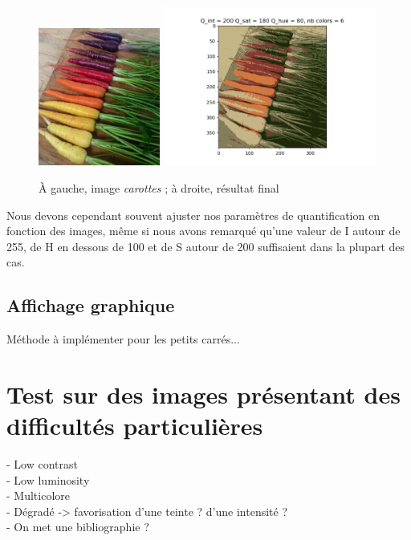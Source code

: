 \documentclass{article}
\begin{document}
\begin{figure}[h]
    \centering
    \includegraphics[width=4cm]{carottes.jpg}
    \includegraphics[width=7cm]{fig9.png}
    \caption{À gauche, image {\it carottes} ; à droite, résultat final}
\end{figure}

Nous devons cependant souvent ajuster nos paramètres de quantification en fonction des images, même si nous avons remarqué qu'une valeur de I autour de 255, de H en dessous de 100 et de S autour de 200 suffisaient dans la plupart des cas.\\

\subsection{Affichage graphique}

Méthode à implémenter pour les petits carrés...

\section{Test sur des images présentant des difficultés particulières}

- Low contrast\\
- Low luminosity\\
- Multicolore\\
- Dégradé -> favorisation d'une teinte ? d'une intensité ?\\
- On met une bibliographie ?
\end{document}
